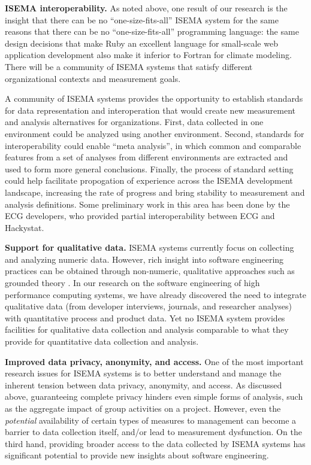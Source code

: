 \documentclass[10pt,twocolumn]{article}
\begin{document}
{\bf ISEMA interoperability.}  As noted above, one result of our research
is the insight that there can be no ``one-size-fits-all'' ISEMA system for
the same reasons that there can be no ``one-size-fits-all'' programming
language: the same design decisions that make Ruby an excellent language
for small-scale web application development also make it inferior to
Fortran for climate modeling.  There will be a community of ISEMA systems
that satisfy different organizational contexts and measurement goals.

A community of ISEMA systems provides the opportunity to establish
standards for data representation and interoperation that would create new
measurement and analysis alternatives for organizations.  First, data
collected in one environment could be analyzed using another environment.
Second, standards for interoperability could enable ``meta analysis'', in
which common and comparable features from a set of analyses from different
environments are extracted and used to form more general
conclusions. Finally, the process of standard setting could help facilitate
propogation of experience across the ISEMA development landscape,
increasing the rate of progress and bring stability to measurement and
analysis definitions.  Some preliminary work in this area has been done by the ECG 
developers, who provided partial interoperability between ECG and Hackystat. 

{\bf Support for qualitative data.} ISEMA systems currently focus on
collecting and analyzing numeric data.  However, rich insight into software
engineering practices can be obtained through non-numeric, qualitative
approaches such as grounded theory \cite{Seaman99}.  In our research on the
software engineering of high performance computing systems, we have already
discovered the need to integrate qualitative data (from developer
interviews, journals, and researcher analyses) with quantitative process
and product data.  Yet no ISEMA system provides facilities for qualitative
data collection and analysis comparable to what they provide for
quantitative data collection and analysis.

{\bf Improved data privacy, anonymity, and access.}  One of the most
important research issues for ISEMA systems is to better understand and
manage the inherent tension between data privacy, anonymity, and access. As
discussed above, guaranteeing complete privacy hinders even simple forms of
analysis, such as the aggregate impact of group activities on a project.
However, even the {\em potential} availability of certain types of measures
to management can become a barrier to data collection itself, and/or lead
to measurement dysfunction.  On the third hand, providing broader access to
the data collected by ISEMA systems has significant potential to provide
new insights about software engineering.
\end{document}
